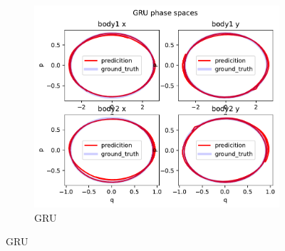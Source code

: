 \begin{figure}[H]
\begin{subfigure}[b]{0.3\textwidth}
		\centering
		\includegraphics[width=\textwidth]{chapters/chapter5/body2_gru_ps.pdf}
		\caption{GRU}
	\end{subfigure}
	
	\vspace{0.5cm} %
	

\end{figure}
